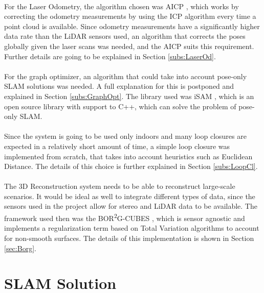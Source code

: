 \documentclass[12pt]{article}
\begin{document}
	\paragraph{}
	For the Laser Odometry, the algorithm chosen was AICP \cite{7989547}, which works by correcting the odometry measurements by using the ICP algorithm every time a point cloud is available. Since odometry measurements have a significantly higher data rate than the LiDAR sensors used, an algorithm that corrects the poses globally given the laser scans was needed, and the AICP suits this requirement. Further details are going to be explained in Section \ref{subs:LaserOd}.
	
	\paragraph{}
	For the graph optimizer, an algorithm that could take into account pose-only SLAM solutions was needed. A full explanation for this is postponed and explained in Section \ref{subs:GraphOpt}. The library used was iSAM \cite{Kaess08tro}, which is an open source library with support to C++, which can solve the problem of pose-only SLAM.
	
	\paragraph{}
	Since the system is going to be used only indoors and many loop closures are expected in a relatively short amount of time, a simple loop closure was implemented from scratch, that takes into account heuristics such as Euclidean Distance. The details of this choice is further explained in Section \ref{subs:LoopCl}.
	
	\paragraph{}
	The 3D Reconstruction system needs to be able to reconstruct large-scale scenarios. It would be ideal as well to integrate different types of data, since the sensors used in the project allow for stereo and LiDAR data to be available. The framework used then was the BOR\textsuperscript{2}G-CUBES \cite{TannerFSR2015}\cite{TannerArXiv2016}, which is sensor agnostic and implements a regularization term based on Total Variation algorithms to account for non-smooth surfaces. The details of this implementation is shown in Section \ref{sec:Borg}.
		
	\newpage
	\section{SLAM Solution}
\end{document}
